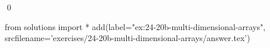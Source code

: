 
\begin{ex} 
  \label{ex:24-20b-multi-dimensional-arrays}
  
  \qed
\end{ex} 
\begin{python0}
from solutions import *
add(label="ex:24-20b-multi-dimensional-arrays",
    srcfilename='exercises/24-20b-multi-dimensional-arrays/answer.tex') 
\end{python0}
